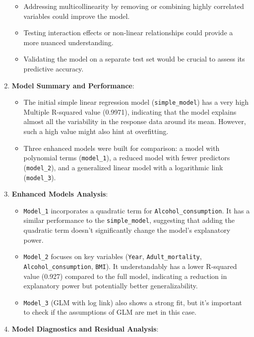\documentclass[
]{article}
\providecommand{\tightlist}{%
  \setlength{\itemsep}{0pt}\setlength{\parskip}{0pt}}
\begin{document}
\begin{enumerate}
  \begin{itemize}
  \tightlist
  \item
    Addressing multicollinearity by removing or combining highly
    correlated variables could improve the model.
  \item
    Testing interaction effects or non-linear relationships could
    provide a more nuanced understanding.
  \item
    Validating the model on a separate test set would be crucial to
    assess its predictive accuracy.
  \end{itemize}
\item
  \textbf{Model Summary and Performance}:

  \begin{itemize}
  \tightlist
  \item
    The initial simple linear regression model (\texttt{simple\_model})
    has a very high Multiple R-squared value (0.9971), indicating that
    the model explains almost all the variability in the response data
    around its mean. However, such a high value might also hint at
    overfitting.
  \item
    Three enhanced models were built for comparison: a model with
    polynomial terms (\texttt{model\_1}), a reduced model with fewer
    predictors (\texttt{model\_2}), and a generalized linear model with
    a logarithmic link (\texttt{model\_3}).
  \end{itemize}
\item
  \textbf{Enhanced Models Analysis}:

  \begin{itemize}
  \tightlist
  \item
    \texttt{Model\_1} incorporates a quadratic term for
    \texttt{Alcohol\_consumption}. It has a similar performance to the
    \texttt{simple\_model}, suggesting that adding the quadratic term
    doesn't significantly change the model's explanatory power.
  \item
    \texttt{Model\_2} focuses on key variables (\texttt{Year},
    \texttt{Adult\_mortality}, \texttt{Alcohol\_consumption},
    \texttt{BMI}). It understandably has a lower R-squared value (0.927)
    compared to the full model, indicating a reduction in explanatory
    power but potentially better generalizability.
  \item
    \texttt{Model\_3} (GLM with log link) also shows a strong fit, but
    it's important to check if the assumptions of GLM are met in this
    case.
  \end{itemize}
\item
  \textbf{Model Diagnostics and Residual Analysis}:
\end{enumerate}
\end{document}
